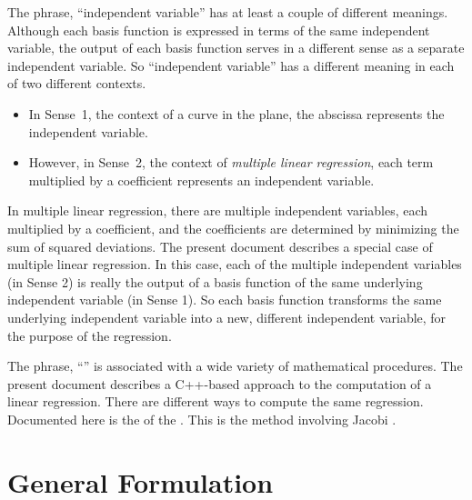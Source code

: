 \documentclass[twocolumn]{article}
\begin{document}
The phrase, ``independent variable'' has at least a couple of different
meanings. Although each basis function is expressed in terms of the same
independent variable, the output of each basis function serves in a different
sense as a separate independent variable. So ``independent variable'' has a
different meaning in each of two different contexts.
\begin{itemize}
   \item In Sense~1, the context of a curve in the plane, the abscissa
      represents the independent variable.
   \item However, in Sense~2, the context of \emph{multiple linear regression},
      each term multiplied by a coefficient represents an independent variable.
\end{itemize}
In multiple linear regression, there are multiple independent variables, each
multiplied by a coefficient, and the coefficients are determined by minimizing
the sum of squared deviations.  The present document describes a special case
of multiple linear regression. In this case, each of the multiple independent
variables (in Sense 2) is really the output of a basis function of the same
underlying independent variable (in Sense 1). So each basis function transforms
the same underlying independent variable into a new, different independent
variable, for the purpose of the regression.

The phrase, ``'' is associated
with a wide variety of mathematical procedures. The present document describes
a C++-based approach to the computation of a linear regression.  There are
different ways to compute the same regression. Documented here is the
of the .  This is the
method involving Jacobi .

\section{General Formulation}
\end{document}
